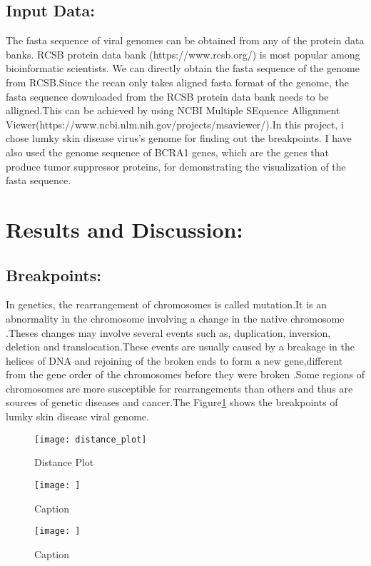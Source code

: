 \documentclass{article}
\begin{document}
\subsection{Input Data:}
The fasta sequence of viral genomes can be obtained from any of the protein data banks. RCSB protein data bank \cite{rose2016rcsb}(https://www.rcsb.org/) is most popular among bioinformatic  scientists.  We can directly obtain the fasta sequence of the genome from RCSB.Since the recan only takes aligned fasta format of the genome, the fasta sequence downloaded from the RCSB protein data bank needs to be alligned.This can be achieved by using NCBI Multiple SEquence Allignment Viewer(https://www.ncbi.nlm.nih.gov/projects/msaviewer/).In this project, i chose lumky skin disease virus's genome \cite{sprygin2018epidemiological} for finding out the breakpoints. I have also used the genome sequence of BCRA1 genes, which are the genes that produce tumor suppressor proteins, for demonstrating the visualization of the fasta sequence.

\section{Results and Discussion:}
\subsection{Breakpoints:}
In genetics, the rearrangement of chromosomes is called mutation.It is an abnormality in the chromosome involving a change in the native chromosome  \cite{zhao2012genome}.Theses changes may involve  several events such as, duplication, inversion, deletion and translocation.These events are usually caused by a breakage in the helices of DNA and rejoining of the broken ends to form a new gene,different from the gene order of the chromosomes before they were broken \cite{griffiths2002modern}.Some regions of chromosomes are more susceptible for rearrangements than others and thus are sources of genetic diseases and cancer.The Figure\ref{Figure:1} shows the breakpoints of lumky skin disease viral genome.

\begin{figure}
    \centering
    \texttt{[image: distance\_plot]}
    \caption{Distance Plot}
    \label{Figure:1}
\end{figure}
















\begin{figure}
    \centering
    \texttt{[image: ]}
    \caption{Caption}
    \label{ternary}
\end{figure}

\begin{figure}
    \centering
    \texttt{[image: ]}
    \caption{Caption}
    \label{ternary}
\end{figure}



 

\end{document}
